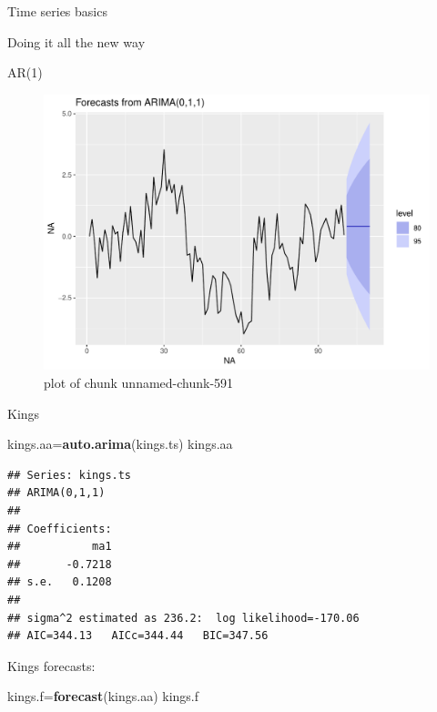 \documentclass[ignorenonframetext,]{beamer}
\newenvironment{Shaded}{\begin{snugshade}}{\end{snugshade}}
\newcommand{\KeywordTok}[1]{\textcolor[rgb]{0.13,0.29,0.53}{\textbf{#1}}}
\newcommand{\NormalTok}[1]{#1}
\begin{document}
\begin{frame}[fragile]{Time series basics}
\begin{block}{Doing it all the new way}
\begin{block}{AR(1)}
\begin{figure}
\centering
\includegraphics{figure/unnamed-chunk-591-1.pdf}
\caption{plot of chunk unnamed-chunk-591}
\end{figure}

\end{block}

\begin{block}{Kings}

\begin{Shaded}
\begin{Highlighting}[]
\NormalTok{kings.aa=}\KeywordTok{auto.arima}\NormalTok{(kings.ts)}
\NormalTok{kings.aa}
\end{Highlighting}
\end{Shaded}

\begin{verbatim}
## Series: kings.ts 
## ARIMA(0,1,1) 
## 
## Coefficients:
##           ma1
##       -0.7218
## s.e.   0.1208
## 
## sigma^2 estimated as 236.2:  log likelihood=-170.06
## AIC=344.13   AICc=344.44   BIC=347.56
\end{verbatim}

Kings forecasts:

\begin{Shaded}
\begin{Highlighting}[]
\NormalTok{kings.f=}\KeywordTok{forecast}\NormalTok{(kings.aa)}
\NormalTok{kings.f}
\end{Highlighting}
\end{Shaded}


\end{block}
\end{block}
\end{frame}
\end{document}
